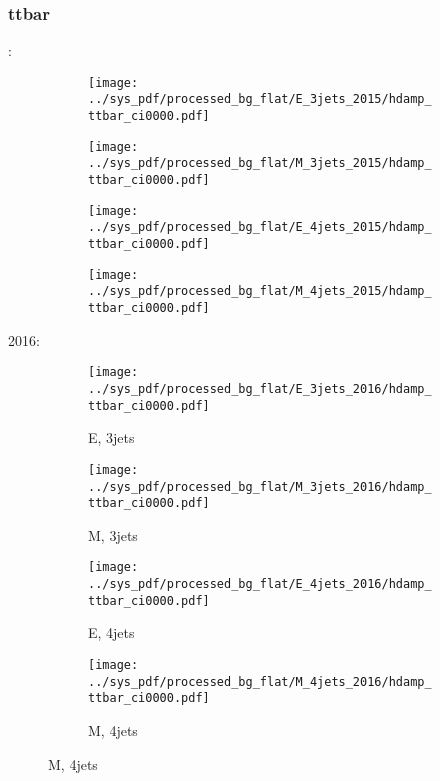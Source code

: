 \documentclass{beamer}
\begin{document}
\begin{frame}
\frametitle{ttbar}
\fontsize{5}{1}:
\begin{figure}
\centering
\begin{subfigure}[b]{0.24\textwidth}
\texttt{[image: ../sys\_pdf/processed\_bg\_flat/E\_3jets\_2015/hdamp\_ttbar\_ci0000.pdf]}
\end{subfigure}
\begin{subfigure}[b]{0.24\textwidth}
\texttt{[image: ../sys\_pdf/processed\_bg\_flat/M\_3jets\_2015/hdamp\_ttbar\_ci0000.pdf]}
\end{subfigure}
\begin{subfigure}[b]{0.24\textwidth}
\texttt{[image: ../sys\_pdf/processed\_bg\_flat/E\_4jets\_2015/hdamp\_ttbar\_ci0000.pdf]}
\end{subfigure}
\begin{subfigure}[b]{0.24\textwidth}
\texttt{[image: ../sys\_pdf/processed\_bg\_flat/M\_4jets\_2015/hdamp\_ttbar\_ci0000.pdf]}
\end{subfigure}
\end{figure}
2016:
\begin{figure}
\centering
\begin{subfigure}[b]{0.24\textwidth}
\texttt{[image: ../sys\_pdf/processed\_bg\_flat/E\_3jets\_2016/hdamp\_ttbar\_ci0000.pdf]}
\captionsetup{font=tiny}
\caption{E, 3jets}
\end{subfigure}
\begin{subfigure}[b]{0.24\textwidth}
\texttt{[image: ../sys\_pdf/processed\_bg\_flat/M\_3jets\_2016/hdamp\_ttbar\_ci0000.pdf]}
\captionsetup{font=tiny}
\caption{M, 3jets}
\end{subfigure}
\begin{subfigure}[b]{0.24\textwidth}
\texttt{[image: ../sys\_pdf/processed\_bg\_flat/E\_4jets\_2016/hdamp\_ttbar\_ci0000.pdf]}
\captionsetup{font=tiny}
\caption{E, 4jets}
\end{subfigure}
\begin{subfigure}[b]{0.24\textwidth}
\texttt{[image: ../sys\_pdf/processed\_bg\_flat/M\_4jets\_2016/hdamp\_ttbar\_ci0000.pdf]}
\captionsetup{font=tiny}
\caption{M, 4jets}
\end{subfigure}
\end{figure}
\end{frame}
\end{document}
